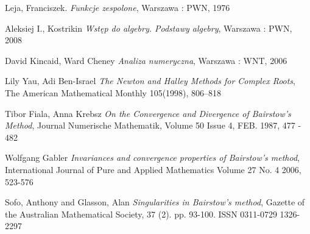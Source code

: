 \documentclass{article}
\begin{document}
\begin{thebibliography}{99}
 Leja, Franciszek.
\emph{Funkcje zespolone},
Warszawa : PWN, 1976

 Aleksiej I., Kostrikin
\emph{Wstęp do algebry. Podstawy algebry},
Warszawa : PWN, 2008

 David Kincaid, Ward Cheney
\emph{Analiza numeryczna},
Warszawa : WNT, 2006

Lily Yau, Adi Ben-Israel
\emph{The Newton and Halley Methods for Complex Roots},
The American Mathematical Monthly 105(1998), 806–818

Tibor Fiala, Anna Krebsz
\emph{On the Convergence and Divergence of Bairstow's Method},
Journal Numerische Mathematik, Volume 50 Issue 4, FEB. 1987, 477 - 482

Wolfgang Gabler
\emph{Invariances and convergence properties of Bairstow's method},
International Journal of Pure and Applied Mathematics Volume 27 No. 4 2006, 523-576

Sofo, Anthony and Glasson, Alan
\emph{Singularities in Bairstow’s method},
Gazette of the Australian Mathematical Society, 37 (2). pp. 93-100. ISSN 0311-0729 1326-2297

\end{thebibliography}
\end{document}
